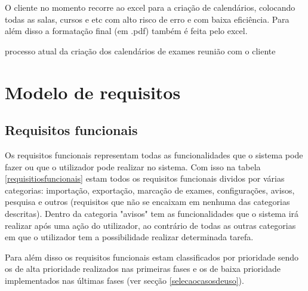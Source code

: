 \documentclass[11pt, twoside]{report}
\begin{document}
	O cliente no momento recorre ao excel para a criação de calendários,  colocando todas as salas, cursos e etc com alto risco de erro e com baixa eficiência. Para além disso a formatação final (em .pdf) também é feita pelo excel.

	
	



	processo atual da criação dos calendários de exames
	reunião com o cliente
	
	\chapter{Modelo de requisitos}
	\section{Requisitos funcionais}
	
	
	Os requisitos funcionais representam todas as funcionalidades que o sistema pode fazer ou que o utilizador pode realizar no sistema. Com isso na tabela \ref{requisitiosfuncionais} estam todos os requisitos funcionais dividos por várias categorias: importação, exportação, marcação de exames, configurações, avisos, pesquisa e outros (requisitos que não se encaixam em nenhuma das categorias descritas). Dentro da categoria "avisos" tem as funcionalidades que o sistema irá realizar após uma ação do utilizador, ao contrário de todas as outras categorias em que o utilizador tem a possibilidade realizar determinada tarefa.
	
	Para além disso os requisitos funcionais estam classificados por prioridade sendo os de alta prioridade realizados nas primeiras fases e os de baixa prioridade implementados nas últimas fases (ver secção \ref{selecaocasosdeuso}).  
	
	
	
\end{document}
